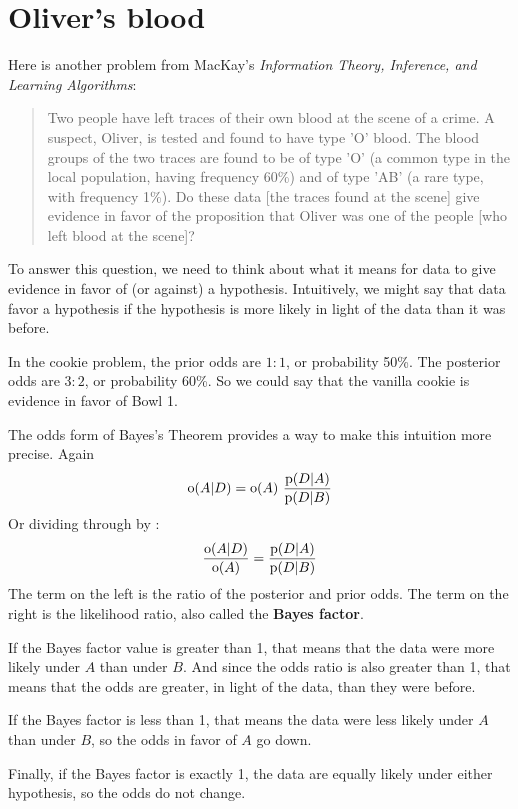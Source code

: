 \documentclass[12pt]{book}
\begin{document}
\section{Oliver's blood}
\label{oliver}

Here is another problem from MacKay's {\it Information Theory,
  Inference, and Learning Algorithms}:

\begin{quote}
Two people have left traces of their own blood at the scene of
a crime.  A suspect, Oliver, is tested and found to have type
'O' blood.  The blood groups of the two traces are found to
be of type 'O' (a common type in the local population, having frequency
60\%) and of type 'AB' (a rare type, with frequency 1\%).
Do these data [the traces found at the scene] give evidence
in favor of the proposition that Oliver was one of the people
[who left blood at the scene]?
\end{quote}

To answer this question, we need to think about what it means
for data to give evidence in favor of (or against) a hypothesis.
Intuitively, we might say that data favor a hypothesis if the
hypothesis is more likely in light of the data than it was before.

In the cookie problem, the prior odds are $1:1$, or probability 50\%.
The posterior odds are $3:2$, or probability 60\%.  So we could say
that the vanilla cookie is evidence in favor of Bowl 1.

The odds form of Bayes's Theorem provides a way to make this
intuition more precise.  Again
%
\[ \mathrm{o}(A|D) = \mathrm{o}(A)~\frac{\mathrm{p}(D|A)}{\mathrm{p}(D|B)} \]
%
Or dividing through by :
%
\[ \frac{\mathrm{o}(A|D)}{\mathrm{o}(A)} = \frac{\mathrm{p}(D|A)}{\mathrm{p}(D|B)} \]
%
The term on the left is the ratio of the posterior and prior odds.
The term on the right is the likelihood ratio, also called the {\bf Bayes
factor}.

If the Bayes factor value is greater than 1, that means that the
data were more likely under $A$ than under $B$.  And since the
odds ratio is also greater than 1, that means that the odds are
greater, in light of the data, than they were before.

If the Bayes factor is less than 1, that means the data were
less likely under $A$ than under $B$, so the odds in
favor of $A$ go down.

Finally, if the Bayes factor is exactly 1, the data are equally
likely under either hypothesis, so the odds do not change.
\end{document}
